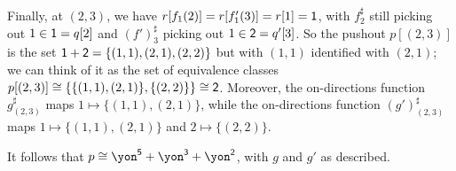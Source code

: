 \documentclass[Book-Poly]{subfiles}
\begin{document}
\begin{exercise}
\begin{solution}
\begin{enumerate}
    Finally, at $(2,3)$, we have $r[f_1(2)] = r[f'_1(3)] = r[1] = \textsf{1}$, with $f^\sharp_2$ still picking out $1 \in \textsf{1} = q[2]$ and $(f')^\sharp_3$ picking out $1 \in \textsf{2} = q'[3]$.
    So the pushout $p[(2,3)]$ is the set $\textsf{1} + \textsf{2} = \{(1,1), (2,1), (2,2)\}$ but with $(1,1)$ identified with $(2,1)$; we can think of it as the set of equivalence classes $p[(2,3)] \cong \{\{(1,1), (2,1)\}, \{(2,2)\}\} \cong \textsf{2}$.
    Moreover, the on-directions function $g^\sharp_{(2,3)}$ maps $1 \mapsto \{(1,1), (2,1)\}$, while the on-directions function $(g')^\sharp_{(2,3)}$ maps $1 \mapsto \{(1,1), (2,1)\}$ and $2 \mapsto \{(2,2)\}$.

    It follows that $p \iso \yon^\5 + \yon^\3 + \yon^\2$, with $g$ and $g'$ as described.
\end{enumerate}
\end{solution}
\end{exercise}
\end{document}
